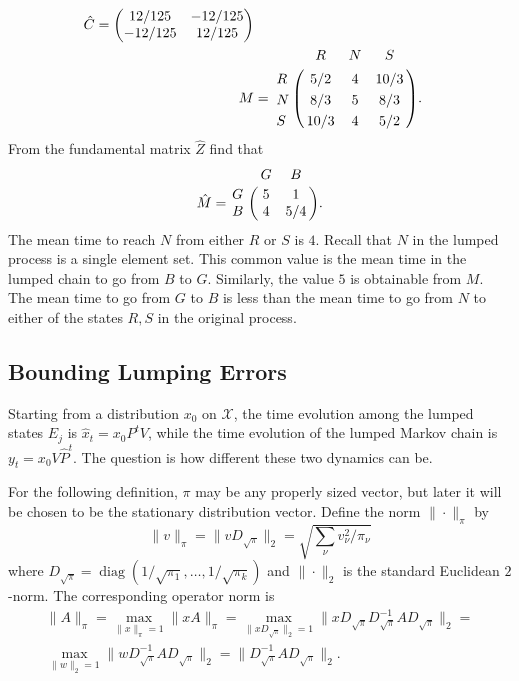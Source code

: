 \documentclass[12pt]{article}
\begin{document}
\begin{example}
    \begin{align*}
        \hat{C} =
        \begin{pmatrix}
            12/125 & -12/125 \\
            -12/125 & 12/125
        \end{pmatrix}
        \\
        M &= \bordermatrix{ & R & N & S \cr
        R & 5/2 & 4 & 10/3 \cr
        N & 8/3 & 5 & 8/3 \cr
        S & 10/3 & 4 & 5/2}.
    \end{align*}
    From the fundamental matrix \( \hat{Z} \) find that
    \[
        \hat{M} = \bordermatrix{ & G & B \cr
        G & 5 & 1 \cr
        B & 4 & 5/4 }.
    \] The mean time to reach \( N \) from either \( R \) or \( S \) is \(
    4 \).  Recall that \( N \) in the lumped process is a single element
    set.  This common value is the mean time in the lumped chain to go
    from \( B \) to \( G \).  Similarly, the value \( 5 \) is obtainable
    from \( M \).  The mean time to go from \( G \) to \( B \) is less
    than the mean time to go from \( N \) to either of the states \( R,S
    \) in the original process.
\end{example}

\subsection*{Bounding Lumping Errors}

Starting from a distribution \( x_0 \) on \( \mathcal{X} \), the time
evolution among the lumped states \( E_j \) is \( \hat{x}_{t} = x_0 P^t
V \), while the time evolution of the lumped Markov chain is \( y_t = x_0V
\hat{P}^t \).  The question is how different these two dynamics can be.

For the following definition, \( \pi \) may be any properly sized
vector, but later it will be chosen to be the stationary distribution
vector. Define the norm \( \| \cdot \|_{\pi} \) by
\[
    \| v\|_{\pi} = \| v D_{\sqrt{\pi}} \|_2 = \sqrt{\sum_{\nu} v_{\nu}^2/\pi_\nu}
\] where \( D_{\sqrt{\pi}} =
\operatorname{diag}
(1/\sqrt{\pi_1}, \dots, 1/\sqrt{\pi_k}) \) and \( \| \cdot \|_2 \) is
the standard Euclidean \( 2 \)-norm.  The corresponding operator norm is
\begin{multline*}
    \| A \|_{\pi} = \max_{\|x\|_{\pi}=1}\|xA\|_{\pi} = \max_{\|xD_{\sqrt
    {\pi}}\|_2 = 1}\|x D_{\sqrt{\pi}} D_{\sqrt{\pi}}^{-1} A D_{\sqrt{\pi}}\|_
    {2} = \\
    \max_{\|w\|_2 = 1}\|w D_{\sqrt{\pi}}^{-1} A D_{\sqrt{\pi}}\|_{2} =
    \| D_{\sqrt{\pi}}^{-1} A D_{\sqrt{\pi}} \|_{2}.
\end{multline*}
\end{document}
